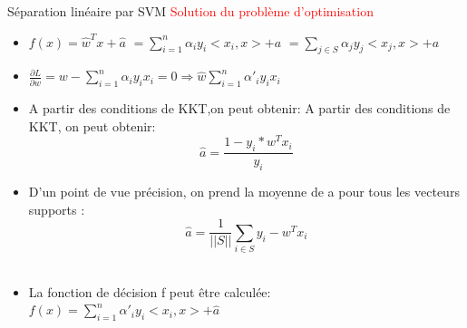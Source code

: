 \documentclass{bredelebeamer}
\begin{document}
\begin{frame}{Séparation linéaire par SVM}
\textcolor{red}{Solution du problème d’optimisation }\vspace{1\baselineskip} \\
\begin{itemize}
      \item $f(x)=\widehat{w}^{T}x+\widehat{a}$ \hspace*{0.3 cm}$=\sum\limits_{i=1}^{n}\alpha_i y_i <x_i,x>+a$ \hspace*{0.3 cm}$=\sum\limits_{j\in S}\alpha_j y_j <x_j,x>+a$\\

 \item  $\frac{\partial L}{\partial w} = w-\sum\limits_{i=1}^{n}\alpha_i y_i x_i =0  \Rightarrow \widehat{w} \sum\limits_{i=1}^{n}\alpha'_i y_i x_i$\\ 
      \item A partir des conditions de KKT,on peut obtenir:
A partir des conditions de KKT, on peut obtenir: $$\widehat{a}=\frac{1-y_i*w^{T}x_i}{y_i}$$
      \item D’un point de vue précision, on prend la moyenne de a pour tous les vecteurs supports :\\
      $$\widehat{a}=\frac{1}{||S||} \sum\limits_{i\in S}y_i  - w^{T}x_i$$\\ 
       \item La fonction de décision f peut être calculée: $f(x)= \sum\limits_{i=1}^{n}\alpha'_i y_i<x_i,x> +\widehat{a}$\\ 
    \end{itemize} 
\end{frame}
\end{document}
